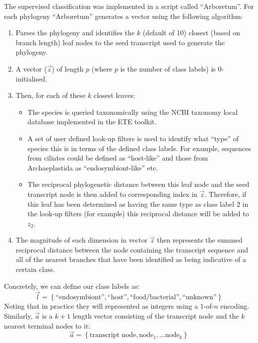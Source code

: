 The supervised classification was implemented in a script called ``Arboretum''.
For each phylogeny ``Arboretum'' generates a vector using the following algorithm: 
\begin{enumerate}
    \item Parses the phylogeny and identifies the \(k\) (default of 10) closest (based
        on branch length) leaf nodes to the seed transcript used to generate the phylogeny.
    \item A vector (\(\vec{z}\)) of length \(p\) (where \(p\) is the number
        of class labels) is \(0\)-initialised.
    \item Then, for each of these \(k\) closest leaves:
        \begin{itemize}
            \item The species is queried taxonomically using the
NCBI taxonomy local database implemented in the ETE toolkit.  
            \item A set of user defined look-up filters is used to identify what ``type'' of species this is in terms of the defined class labels. 
    For example, sequences from ciliates could be defined as ``host-like'' and those
from Archaeplastida as ``endosymbiont-like'' etc. 
            \item The reciprocal phylogenetic distance between this leaf node and the seed transcript node is then added to corresponding index in \(\vec{z}\).  Therefore,
                if this leaf has been determined as having the same type as class label \(2\) in the look-up filters (for example) this reciprocal distance will be added to \(z_{2}\).
        \end{itemize}
    \item The magnitude of each dimension in vector \(\vec{z}\) then represents the summed
        reciprocal distance between the node containing the 
transcript sequence and all
of the nearest branches that have been identified as being indicative of a certain class.
\end{enumerate}

Concretely, we can define our class labels as: 
\[\vec{l} = \left\{\text{``endosymbiont''}, \text{``host''}, \text{``food/bacterial''}, \text{``unknown''}\right\}\] 
Noting that in practice they will represented as integers using a 
\(1\)-of-\(n\) encoding.
Similarly, \(\vec{a}\) is a \(k+1\) length vector consisting of the 
transcript node and the 
\(k\) nearest terminal nodes to it: \[
    \vec{a} = \left\{\text{transcript node}, \text{node}_{1}, ... \text{node}_{k}\right\}\]

